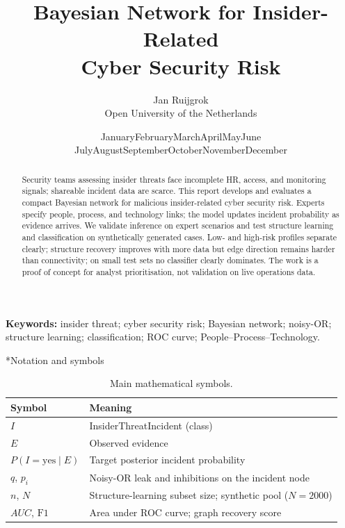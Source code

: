 \documentclass[11pt,a4paper]{article}
\title{Bayesian Network for Insider-Related\\Cyber Security Risk}
\author{Jan Ruijgrok\\Open University of the Netherlands}
\date{%
  \ifcase\month\or
    January\or February\or March\or April\or May\or June\or
    July\or August\or September\or October\or November\or December\fi
  \space\number\year}
\makeatletter
\renewcommand\section{\@startsection{section}{1}{\z@}{8pt plus 2pt}{5pt}{\normalfont\large\bfseries}}
\makeatother
\begin{document}
\maketitle

\begin{abstract}
Security teams assessing insider threats face incomplete HR, access, and monitoring signals; shareable incident data are scarce. This report develops and evaluates a compact Bayesian network for malicious insider-related cyber security risk. Experts specify people, process, and technology links; the model updates incident probability as evidence arrives. We validate inference on expert scenarios and test structure learning and classification on synthetically generated cases. Low- and high-risk profiles separate clearly; structure recovery improves with more data but edge direction remains harder than connectivity; on small test sets no classifier clearly dominates. The work is a proof of concept for analyst prioritisation, not validation on live operations data.
\end{abstract}

\noindent\textbf{Keywords:}
insider threat; cyber security risk; Bayesian network; noisy-OR; structure learning; classification; ROC curve; People--Process--Technology.

\section*{Notation and symbols}

\begin{table}[H]
\centering
\footnotesize
\caption{Main mathematical symbols.}
\label{tab:symbols}
\begin{tabular}{@{}lp{10.5cm}@{}}
\toprule
Symbol & Meaning \\
\midrule
$I$ & InsiderThreatIncident (class) \\
$E$ & Observed evidence \\
$P(I{=}\text{yes}\mid E)$ & Target posterior incident probability \\
$q$, $p_i$ & Noisy-OR leak and inhibitions on the incident node \\
$n$, $N$ & Structure-learning subset size; synthetic pool ($N{=}2000$) \\
$AUC$, $\mathrm{F1}$ & Area under ROC curve; graph recovery score \\
\bottomrule
\end{tabular}
\end{table}
\end{document}
